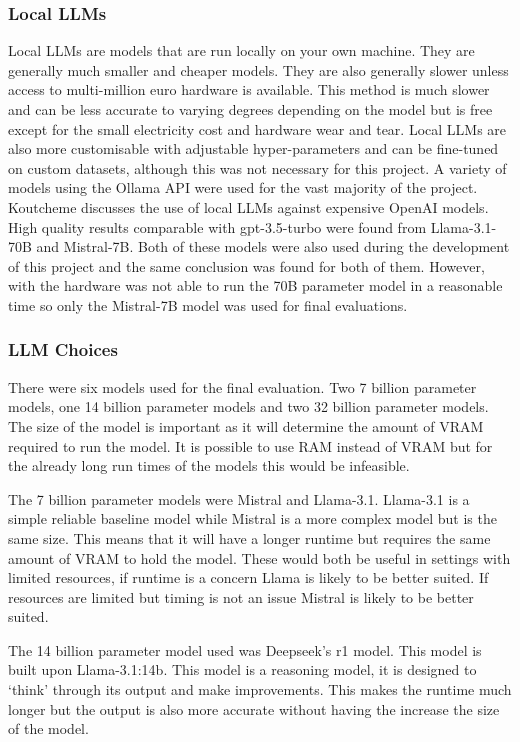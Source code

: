 \documentclass[12pt]{extarticle}
\begin{document}
\subsubsection{Local LLMs}

Local LLMs are models that are run locally on your own machine. They are generally much smaller and cheaper models. They are also generally slower unless access to multi-million euro hardware is available. This method is much slower and can be less accurate to varying degrees depending on the model but is free except for the small electricity cost and hardware wear and tear. Local LLMs are also more customisable with adjustable hyper-parameters and can be fine-tuned on custom datasets, although this was not necessary for this project. A variety of models using the Ollama API were used for the vast majority of the project. Koutcheme \cite{Koutcheme2025} discusses the use of local LLMs against expensive OpenAI models. High quality results comparable with gpt-3.5-turbo were found from Llama-3.1-70B and Mistral-7B. Both of these models were also used during the development of this project and the same conclusion was found for both of them. However, with the hardware was not able to run the 70B parameter model in a reasonable time so only the Mistral-7B model was used for final evaluations.

\subsubsection{LLM Choices}

There were six models used for the final evaluation. Two 7 billion parameter models, one 14 billion parameter models and two 32 billion parameter models. The size of the model is important as it will determine the amount of VRAM required to run the model. It is possible to use RAM instead of VRAM but for the already long run times of the models this would be infeasible.

The 7 billion parameter models were Mistral and Llama-3.1. Llama-3.1 is a simple reliable baseline model while Mistral is a more complex model but is the same size. This means that it will have a longer runtime but requires the same amount of VRAM to hold the model. These would both be useful in settings with limited resources, if runtime is a concern Llama is likely to be better suited. If resources are limited but timing is not an issue Mistral is likely to be better suited.

The 14 billion parameter model used was Deepseek's r1 model. This model is built upon Llama-3.1:14b. This model is a reasoning model, it is designed to `think' through its output and make improvements. This makes the runtime much longer but the output is also more accurate without having the increase the size of the model.
\end{document}
